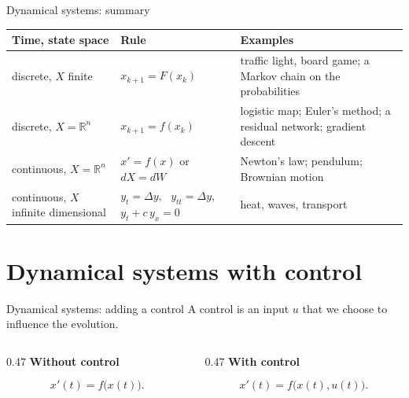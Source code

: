 \documentclass[10pt]{beamer}
\newcommand{\R}{\mathbb{R}}
\begin{document}
\begin{frame}{Dynamical systems: summary}
\renewcommand{\arraystretch}{1.3}
\footnotesize
\begin{tabular}{@{}p{} p{} p{}@{}}
\toprule
\textbf{Time, state space} & \textbf{Rule} & \textbf{Examples} \\
\midrule
discrete, $X$ finite & $x_{k+1}=F(x_k)$ & traffic light, board game; a Markov chain on the probabilities \\
discrete, $X=\R^n$ & $x_{k+1}=f(x_k)$ & logistic map; Euler's method; a residual network; gradient descent \\
continuous, $X=\R^n$ & $x'=f(x)$ or $dX=dW$ & Newton's law; pendulum; Brownian motion \\
continuous, $X$ infinite dimensional & $y_t=\Delta y$, \ $y_{tt}=\Delta y$, \ $y_t+c\,y_x=0$ & heat, waves, transport \\
\bottomrule
\end{tabular}


\end{frame}


\section{Dynamical systems with control}

\begin{frame}{Dynamical systems: adding a control}
A control is an \alert{input $u$ that we choose} to influence the evolution.

\medskip
\begin{columns}[T,onlytextwidth]
\begin{column}{0.47\textwidth}
\alert{\textbf{Without control}}


\[
x'(t)=f\big(x(t)\big).
\]
\end{column}
\begin{column}{0.47\textwidth}
\alert{\textbf{With control}}

\[
x'(t)=f\big(x(t),u(t)\big).
\]
\end{column}
\end{columns}
\end{frame}
\end{document}
